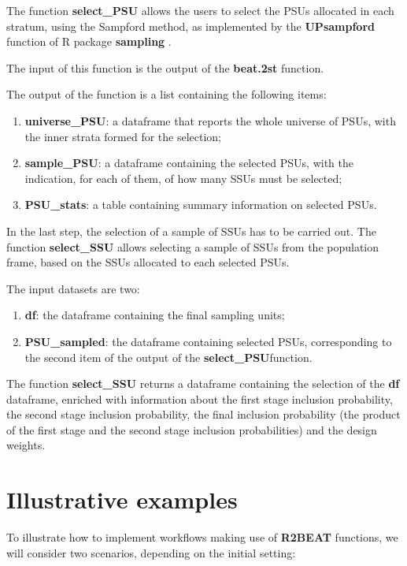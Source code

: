 The function \textbf{select\_PSU} allows the users to select the PSUs allocated in each stratum, using the Sampford method, as implemented by the \textbf{UPsampford} function of R package \textbf{sampling} \citep{Rsampling}. 

The input of this function is the output of the \textbf{beat.2st} function.

The output of the function is a list containing the following items:

\begin{enumerate}
	\item \textbf{universe\_PSU}: a dataframe that reports the whole universe of PSUs, with the inner strata formed for the selection;
	\item \textbf{sample\_PSU}: a dataframe containing the selected PSUs, with the indication, for each of them, of how many SSUs must be selected;
	\item \textbf{PSU\_stats}: a table containing summary information on selected PSUs.
\end{enumerate}

In the last step, the selection of a sample of SSUs has to be carried out. The function \textbf{select\_SSU} allows selecting a sample of SSUs from the population frame, based on the SSUs allocated to each selected PSUs. 

The input datasets are two:
\begin{enumerate}
	\item \textbf{df}: the dataframe containing the final sampling units;
	\item \textbf{PSU\_sampled}: the dataframe containing selected PSUs, corresponding to the second item of the output of the \textbf{select\_PSU}function.
\end{enumerate}

The function \textbf{select\_SSU} returns a dataframe containing the  selection of the \textbf{df} dataframe, enriched with information about the first stage inclusion probability, the second stage inclusion probability, the final inclusion probability (the product of the first stage and the second stage inclusion probabilities) and the design weights.

\section{Illustrative examples} \label{sec:example}

To illustrate how to implement workflows making use of \textbf{R2BEAT} functions, we will consider two scenarios, depending on the initial setting:

